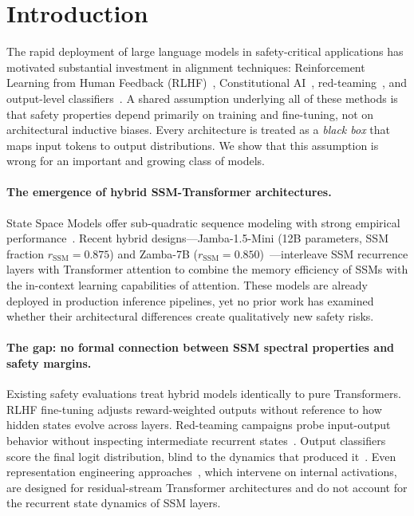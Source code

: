 \documentclass{article}
\newcommand{\rSSM}{r_{\mathrm{SSM}}}
\begin{document}
\section{Introduction}
\label{sec:intro}

The rapid deployment of large language models in safety-critical applications
has motivated substantial investment in alignment techniques: Reinforcement
Learning from Human Feedback (RLHF)~\cite{ouyang2022training}, Constitutional
AI~\cite{bai2022constitutional}, red-teaming~\cite{perez2022red}, and
output-level classifiers~\cite{inan2023llama}.  A shared assumption underlying
all of these methods is that safety properties depend primarily on training and
fine-tuning, not on architectural inductive biases.  Every architecture is
treated as a \emph{black box} that maps input tokens to output distributions.
We show that this assumption is wrong for an important and growing class of
models.

\paragraph{The emergence of hybrid SSM-Transformer architectures.}
State Space Models offer sub-quadratic sequence modeling with strong empirical
performance~\cite{gu2022efficiently,gu2023mamba,dao2024mamba2}.  Recent hybrid
designs---Jamba-1.5-Mini (12B parameters, SSM fraction $\rSSM = 0.875$) and
Zamba-7B ($\rSSM = 0.850$)~\cite{lieber2024jamba,glorioso2024zamba}---interleave
SSM recurrence layers with Transformer attention to combine the memory
efficiency of SSMs with the in-context learning capabilities of attention.
These models are already deployed in production inference pipelines, yet no
prior work has examined whether their architectural differences create
qualitatively new safety risks.

\paragraph{The gap: no formal connection between SSM spectral properties and
safety margins.}
Existing safety evaluations treat hybrid models identically to pure
Transformers.  RLHF fine-tuning adjusts reward-weighted outputs without
reference to how hidden states evolve across layers.  Red-teaming campaigns
probe input-output behavior without inspecting intermediate recurrent
states~\cite{ganguli2022red}.  Output classifiers score the final logit
distribution, blind to the dynamics that produced it~\cite{inan2023llama}.
Even representation engineering approaches~\cite{zou2023representation}, which
intervene on internal activations, are designed for residual-stream Transformer
architectures and do not account for the recurrent state dynamics of SSM layers.
\end{document}
